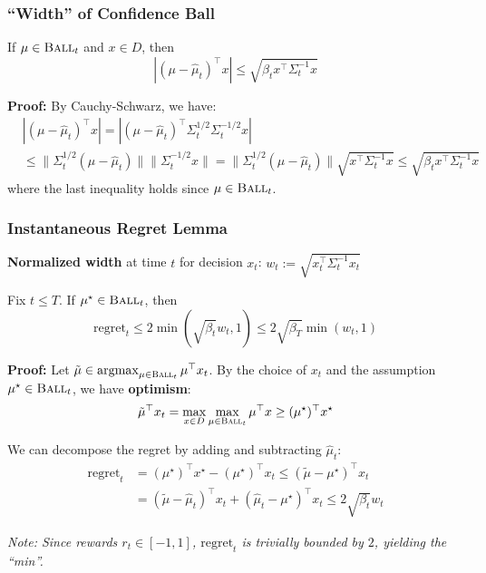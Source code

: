 \documentclass[aspectratio=169]{beamer}
\begin{document}
\begin{frame}\frametitle{``Width'' of Confidence Ball}

\begin{lemma} \label{lemma:width}
If $\mu \in \textsc{Ball}_t$ and $x \in D$, then 
\[
|(\mu - \widehat{\mu}_t)^\top x| \le \sqrt{\beta_t x^\top \Sigma_t^{-1}x}
\]
\end{lemma}

\pause
\textbf{Proof:}
By
Cauchy-Schwarz, we have:
\begin{align*}
&|(\mu - \widehat{\mu}_t)^\top x| = 
|(\mu - \widehat{\mu}_t)^\top  \Sigma_t^{1/2}\Sigma_t^{-1/2}x| \\
& \le \| \Sigma_t^{1/2}(\mu - \widehat{\mu}_t) \| \|\Sigma_t^{-1/2}x\| 
= \|\Sigma_t^{1/2}(\mu - \widehat{\mu}_t)\| 
\sqrt{x^\top  \Sigma_t^{-1} x} 
\le \sqrt{\beta_t x^\top \Sigma_t^{-1}x} 
\end{align*}
where the last inequality holds since $\mu \in \textsc{Ball}_t$. 


\end{frame}


\begin{frame}\frametitle{Instantaneous Regret Lemma}

\textbf{Normalized width} at time $t$ for decision $x_t$: \quad $w_t := \sqrt{x_t^\top \Sigma_t^{-1} x_t}$

\vspace*{-0.1cm}
\begin{lemma} \label{lem:regretvswidth}
Fix $t\le T$. If $\mu^\star \in \textsc{Ball}_t$, then
\[
\mathrm{regret}_t \le 2\min(\sqrt{\beta_t} w_t , 1) \le 2 \sqrt{\beta_T}\min(w_t , 1)
\]
\end{lemma}

\pause
\textbf{Proof:} Let $\tilde{\mu} \in \operatorname*{argmax}_{\mu \in \textsc{Ball}_t} \mu^\top x_t$.
By the choice of $x_t$ and the assumption $\mu^\star \in \textsc{Ball}_t$, we have \textbf{optimism}:
\[
\tilde{\mu}^\top x_t = \max_{x\in D}\max_{\mu \in \textsc{Ball}_t} \mu^\top x \ge (\mu^\star)^\top x^\star
\]

\pause
\vspace{0.1cm}
We can decompose the regret by adding and subtracting $\hat{\mu}_t$:
\begin{align*}
\mathrm{regret}_t &= (\mu^\star)^\top x^\star - (\mu^\star)^\top x_t \le (\tilde{\mu} - \mu^\star)^\top x_t \\
&= (\tilde{\mu} - \hat{\mu}_t)^\top x_t + (\hat{\mu}_t - \mu^\star)^\top x_t \le 2\sqrt{\beta_t}w_t
\end{align*}

\pause
{\footnotesize \textit{Note: Since rewards $r_t \in [-1,1]$, $\mathrm{regret}_t$ is trivially bounded by $2$, yielding the ``min''.}}
\end{frame}
\end{document}
